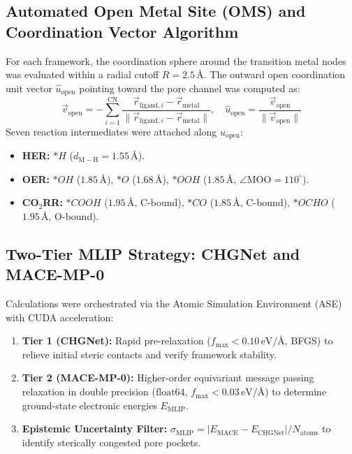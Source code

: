 \subsection{Automated Open Metal Site (OMS) and Coordination Vector Algorithm}
For each framework, the coordination sphere around the transition metal nodes was evaluated within a radial cutoff $R = 2.5\,\text{\AA}$. The outward open coordination unit vector $\hat{u}_{\mathrm{open}}$ pointing toward the pore channel was computed as:
\begin{equation}
    \vec{v}_{\mathrm{open}} = -\sum_{i=1}^{\mathrm{CN}} \frac{\vec{r}_{\mathrm{ligand},i} - \vec{r}_{\mathrm{metal}}}{\|\vec{r}_{\mathrm{ligand},i} - \vec{r}_{\mathrm{metal}}\|}, \quad \hat{u}_{\mathrm{open}} = \frac{\vec{v}_{\mathrm{open}}}{\|\vec{v}_{\mathrm{open}}\|}
\end{equation}
Seven reaction intermediates were attached along $\hat{u}_{\mathrm{open}}$:
\begin{itemize}
    \item \textbf{HER:} $*H$ ($d_{\mathrm{M-H}} = 1.55\,\text{\AA}$).
    \item \textbf{OER:} $*OH$ ($1.85\,\text{\AA}$), $*O$ ($1.68\,\text{\AA}$), $*OOH$ ($1.85\,\text{\AA}$, $\angle\mathrm{MOO} = 110^\circ$).
    \item \textbf{CO$_2$RR:} $*COOH$ ($1.95\,\text{\AA}$, C-bound), $*CO$ ($1.85\,\text{\AA}$, C-bound), $*OCHO$ ($1.95\,\text{\AA}$, O-bound).
\end{itemize}

\subsection{Two-Tier MLIP Strategy: CHGNet and MACE-MP-0}
Calculations were orchestrated via the Atomic Simulation Environment (ASE) with CUDA acceleration:
\begin{enumerate}
    \item \textbf{Tier 1 (CHGNet):} Rapid pre-relaxation ($f_{\mathrm{max}} < 0.10\,\text{eV/\AA}$, BFGS) to relieve initial steric contacts and verify framework stability.
    \item \textbf{Tier 2 (MACE-MP-0):} Higher-order equivariant message passing relaxation in double precision ($\mathrm{float64}$, $f_{\mathrm{max}} < 0.03\,\text{eV/\AA}$) to determine ground-state electronic energies $E_{\mathrm{MLIP}}$.
    \item \textbf{Epistemic Uncertainty Filter:} $\sigma_{\mathrm{MLIP}} = |E_{\mathrm{MACE}} - E_{\mathrm{CHGNet}}| / N_{\mathrm{atoms}}$ to identify sterically congested pore pockets.
\end{enumerate}


